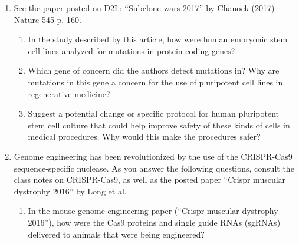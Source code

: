 \documentclass[basic]{inVerba-notes}
\begin{document}
\begin{enumerate}[align=left, leftmargin=0pt, labelindent=\parindent, listparindent=\parindent, labelwidth=0pt, itemindent=!]\color{minor}
  \item {} See the paper posted on D2L\@: “Subclone wars 2017” by Chanock (2017) Nature 545 p. 160.
  \begin{enumerate}
    \item {} In the study described by this article, how were human embryonic stem cell lines analyzed for mutations in protein coding genes?
    \basec{\begin{itemize}
      \item 
    \end{itemize}}
    
    \item {} Which gene of concern did the authors detect mutations in? Why are mutations in this gene a concern for the use of pluripotent cell lines in regenerative medicine?
    \basec{\begin{itemize}
      \item 
    \end{itemize}}
    
    \item {} Suggest a potential change or specific protocol for human pluripotent stem cell culture that could help improve safety of these kinds of cells in medical procedures. Why would this make the procedures safer?
    \basec{\begin{itemize}
      \item 
    \end{itemize}}
    
  \end{enumerate}

  \item {} Genome engineering has been revolutionized by the use of the CRISPR-Cas9 sequence-specific nuclease. As you answer the following questions, consult the class notes on CRISPR-Cas9, as well as the posted paper “Crispr muscular dystrophy 2016” by Long et al.
  \begin{enumerate}
    \item {} In the mouse genome engineering paper (“Crispr muscular dystrophy 2016”), how were the Cas9 proteins and single guide RNAs (sgRNAs) delivered to animals that were being engineered?
    \basec{\begin{itemize}
      \item 
    \end{itemize}}
    

\end{enumerate}
\end{enumerate}
\end{document}
